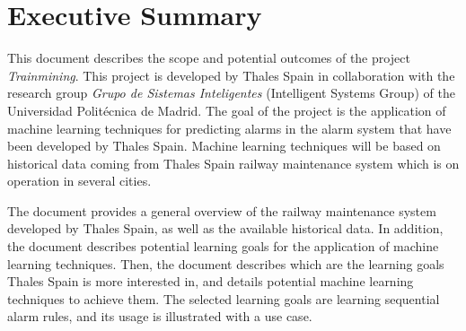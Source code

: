 \documentclass[a4paper,12pt]{article}
\begin{document}
\newcommand\litem[1]{\item{\bfseries #1 }}
%

\onehalfspacing



\section*{Executive Summary}
This document describes the scope and potential outcomes of the project {\it Trainmining}. This project is developed by Thales Spain in collaboration with the research group {\em Grupo de Sistemas Inteligentes} (Intelligent Systems Group) of the
Universidad Politécnica de Madrid. The goal of the project is the application of machine
learning techniques for predicting alarms in the alarm system that have been developed by
Thales Spain. Machine learning techniques will be based on historical data coming from Thales Spain railway maintenance system which is on operation in several cities. 

The document provides a general overview of the railway maintenance system developed by Thales Spain, as well as the available historical data. In addition, the document describes potential learning goals for the application of machine learning techniques. Then, the document describes which are the learning goals Thales Spain is more interested in, and details potential machine learning techniques to achieve them. The selected learning goals are learning sequential alarm rules, and its usage is illustrated with a use case. 

\newpage
\tableofcontents %
\cleardoublepage
{} %
\listoffigures %

\cleardoublepage
{} %
\listoftables %
\cleardoublepage
\end{document}
